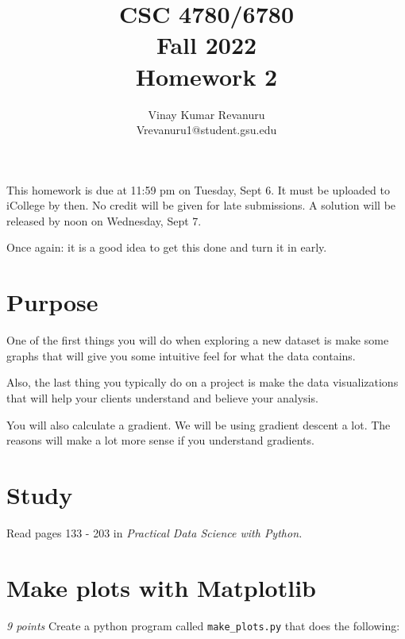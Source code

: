 \documentclass[11pt,english]{article}
\begin{document}
\title{CSC 4780/6780 \\
Fall 2022\\ Homework 2}
\author{Vinay Kumar Revanuru\\ Vrevanuru1@student.gsu.edu}

\maketitle

This homework is due at 11:59 pm on Tuesday,  Sept 6.   It must be uploaded to iCollege by then.  No credit will be given for late submissions.  A solution will be released by noon on Wednesday,  Sept 7.

Once again: it is a good idea to get this done and turn it in early.

\section{Purpose}

One of the first things you will do when exploring a new dataset is make some graphs that will give you some intuitive feel for what the data contains.

Also,  the last thing you typically do on a project is make the data visualizations that will help your clients understand and believe your analysis.

You will also calculate a gradient.  We will be using gradient descent a lot.  The reasons will make a lot more sense if you understand gradients.

\section{Study}

Read pages 133 - 203 in \textit{Practical Data Science with Python.}

\section{Make plots with Matplotlib}

\textit{9 points} Create a python program called \texttt{make\_plots.py} that does the following:
\end{document}
